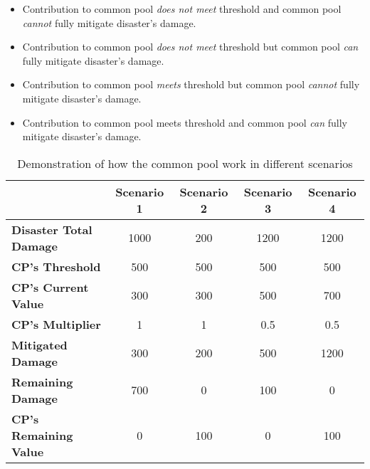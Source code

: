 \begin{itemize}
    \item Contribution to common pool \textit{does not meet} threshold and common pool \textit{cannot} fully mitigate disaster’s damage.
    \item Contribution to common pool \textit{does not meet} threshold but common pool \textit{can} fully mitigate disaster’s damage.
    \item Contribution to common pool \textit{meets} threshold but common pool \textit{cannot} fully mitigate disaster’s damage.
    \item Contribution to common pool meets\textit{} threshold and common pool \textit{can} fully mitigate disaster’s damage.
\end{itemize}

\begin{table}[!htb]
\begin{center}
\begin{tabular}{|l|c|c|c|c|}
\hline
                               & \textbf{Scenario 1} & \textbf{Scenario 2} & \textbf{Scenario 3} & \textbf{Scenario 4} \\ \hline
\textbf{Disaster Total Damage} & 1000                & 200                 & 1200                & 1200                \\ \hline
\textbf{CP's Threshold}        & 500                 & 500                 & 500                 & 500                 \\ \hline
\textbf{CP's Current Value}    & 300                 & 300                 & 500                 & 700                 \\ \hline
\textbf{CP's Multiplier}       & 1                   & 1                   & 0.5                 & 0.5                 \\ \hline
\textbf{Mitigated Damage}      & 300                 & 200                 & 500                 & 1200                \\ \hline
\textbf{Remaining Damage}      & 700                 & 0                   & 100                 & 0                   \\ \hline
\textbf{CP's Remaining Value}  & 0                   & 100                 & 0                   & 100                 \\ \hline
\end{tabular}
\end{center}
\caption{Demonstration of how the common pool work in different scenarios}
\label{tab:Demonstration of how the common pool work in different scenarios}
\end{table}

